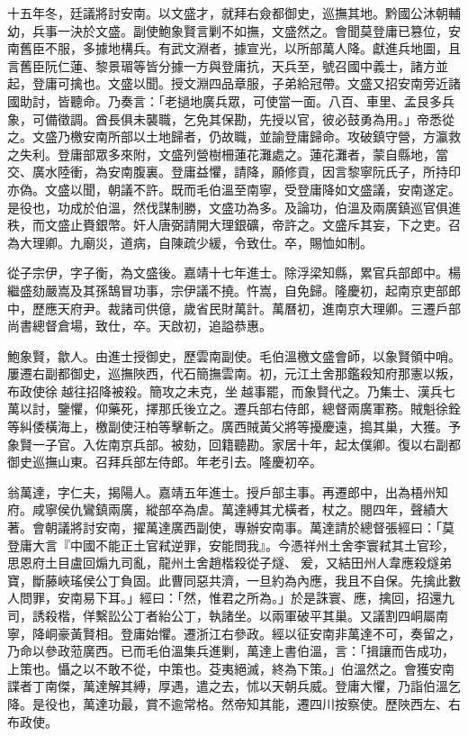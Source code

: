 \begin{pinyinscope}
十五年冬，廷議將討安南。以文盛才，就拜右僉都御史，巡撫其地。黔國公沐朝輔幼，兵事一決於文盛。副使鮑象賢言剿不如撫，文盛然之。會聞莫登庸已篡位，安南舊臣不服，多據地構兵。有武文淵者，據宣光，以所部萬人降。獻進兵地圖，且言舊臣阮仁蓮、黎景瑂等皆分據一方與登庸抗，天兵至，號召國中義士，諸方並起，登庸可擒也。文盛以聞。授文淵四品章服，子弟給冠帶。文盛又招安南旁近諸國助討，皆聽命。乃奏言：「老撾地廣兵眾，可使當一面。八百、車里、孟艮多兵象，可備徵調。酋長俱未襲職，乞免其保勘，先授以官，彼必鼓勇為用。」帝悉從之。文盛乃檄安南所部以土地歸者，仍故職，並諭登庸歸命。攻破鎮守營，方瀛救之失利。登庸部眾多來附，文盛列營樹柵蓮花灘處之。蓮花灘者，蒙自縣地，當交、廣水陸衝，為安南腹裏。登庸益懼，請降，願修貢，因言黎寧阮氏子，所持印亦偽。文盛以聞，朝議不許。既而毛伯溫至南寧，受登庸降如文盛議，安南遂定。是役也，功成於伯溫，然伐謀制勝，文盛功為多。及論功，伯溫及兩廣鎮巡官俱進秩，而文盛止賚銀幣。奸人唐弼請開大理銀礦，帝許之。文盛斥其妄，下之吏。召為大理卿。九廟災，道病，自陳疏少緩，令致仕。卒，賜恤如制。

從子宗伊，字子衡，為文盛後。嘉靖十七年進士。除浮梁知縣，累官兵部郎中。楊繼盛劾嚴嵩及其孫鵠冒功事，宗伊議不撓。忤嵩，自免歸。隆慶初，起南京吏部郎中，歷應天府尹。裁諸司供億，歲省民財萬計。萬曆初，進南京大理卿。三遷戶部尚書總督倉場，致仕，卒。天啟初，追謚恭惠。

鮑象賢，歙人。由進士授御史，歷雲南副使。毛伯溫檄文盛會師，以象賢領中哨。屢遷右副都御史，巡撫陜西，代石簡撫雲南。初，元江土舍那鑑殺知府那憲以叛，布政使徐越往招降被殺。簡攻之未克，坐越事罷，而象賢代之。乃集士、漢兵七萬以討，鑒懼，仰藥死，擇那氏後立之。遷兵部右侍郎，總督兩廣軍務。賊魁徐銓等糾倭橫海上，檄副使汪柏等擊斬之。廣西賊黃父將等擾慶遠，搗其巢，大獲。予象賢一子官。入佐南京兵部。被劾，回籍聽勘。家居十年，起太僕卿。復以右副都御史巡撫山東。召拜兵部左侍郎。年老引去。隆慶初卒。

翁萬達，字仁夫，揭陽人。嘉靖五年進士。授戶部主事。再遷郎中，出為梧州知府。咸寧侯仇鸞鎮兩廣，縱部卒為虐。萬達縛其尤橫者，杖之。閱四年，聲績大著。會朝議將討安南，擢萬達廣西副使，專辦安南事。萬達請於總督張經曰：「莫登庸大言『中國不能正土官弒逆罪，安能問我』。今憑祥州土舍李寰弒其土官珍，思恩府土目盧回煽九司亂，龍州土舍趙楷殺從子燧、爰，又結田州人韋應殺燧弟寶，斷藤峽瑤侯公丁負固。此曹同惡共濟，一旦約為內應，我且不自保。先擒此數人問罪，安南易下耳。」經曰：「然，惟君之所為。」於是誅寰、應，擒回，招還九司，誘殺楷，佯繫訟公丁者紿公丁，執諸坐。以兩軍破平其巢。又議割四峒屬南寧，降峒豪黃賢相。登庸始懼。遷浙江右參政。經以征安南非萬達不可，奏留之，乃命以參政蒞廣西。已而毛伯溫集兵進剿，萬達上書伯溫，言：「揖讓而告成功，上策也。懾之以不敢不從，中策也。芟夷絕滅，終為下策。」伯溫然之。會獲安南諜者丁南傑，萬達解其縛，厚遇，遣之去，怵以天朝兵威。登庸大懼，乃詣伯溫乞降。是役也，萬達功最，賞不逾常格。然帝知其能，遷四川按察使。歷陜西左、右布政使。


\end{pinyinscope}
